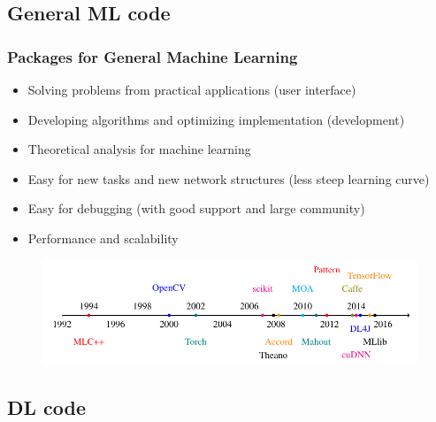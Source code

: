 \subsection{General ML code}

\begin{frame}
  \MyLogo
  \frametitle{Packages for General Machine Learning}  
\small

\begin{itemize}
\item Solving problems from practical applications (user interface)
\item Developing algorithms and optimizing implementation (development)
\item Theoretical analysis for machine learning
\end{itemize}

\begin{itemize}
\item Easy for new tasks and new network structures (less steep learning curve)
\item Easy for debugging (with good support and large community)
\item Performance and scalability
\end{itemize}

\vskip -5pt
\begin{figure}[htbp] %
   \centering
   \includegraphics[width=\linewidth]{figures/ML.pdf} 
\end{figure}

\end{frame}

\subsection{DL code}

